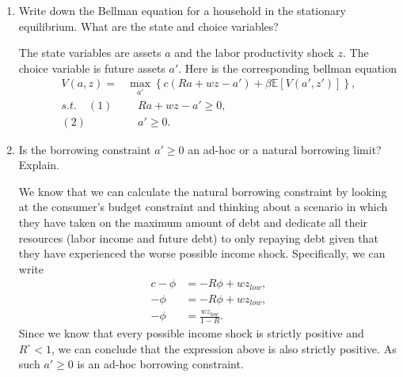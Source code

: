 \documentclass[11pt,english]{article}
\begin{document}
\begin{enumerate}
    \item[(a)] Write down the Bellman equation for a household in the stationary
        equilibrium. What are the state and choice variables?
    \begin{solution}
 The state variables are assets $a$ and the labor productivity shock $z$. The choice variable is future assets $a'$. Here is the corresponding bellman equation \begin{align*}
V(a,z) = &\max_{a'}\left\{c(Ra + wz - a') + \beta \mathbb{E}[V(a',z')]\right\},\\
s.t.\quad (1)&\quad Ra + wz - a' \geq 0,\\
(2)&\quad a' \geq 0.
\end{align*}
    \end{solution}
 
    \item[(b)] Is the borrowing constraint $a' \geq 0$ an ad-hoc or a natural
        borrowing limit? Explain.
    \begin{solution}
We know that we can calculate the natural borrowing constraint by looking at the consumer's budget constraint and thinking about a scenario in which they have taken on the maximum amount of debt and dedicate all their resources (labor income and future debt) to only repaying debt given that they have experienced the worse possible income shock. Specifically, we can write \begin{align*}
c - \phi &= -R\phi + wz_{low},\\
-\phi &= -R\phi + wz_{low},\\
-\phi &= \frac{wz_{low}}{1 - R}.
\end{align*}
 Since we know that every possible income shock is strictly positive and $R^\circ < 1$, we can conclude that the expression above is also strictly positive. As such $a' \geq 0$ is an ad-hoc borrowing constraint.
    \end{solution}
 

\end{enumerate}
\end{document}
